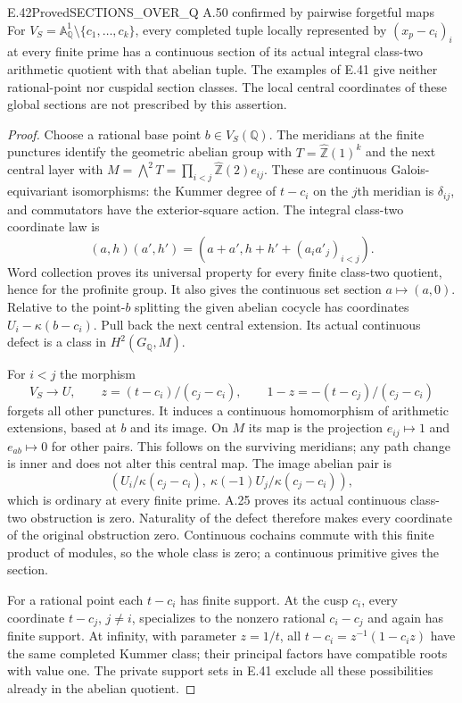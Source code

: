 \begin{result}{E.42}{Proved}{SECTIONS\_OVER\_Q A.50 confirmed by pairwise forgetful maps}
For $V_S=\mathbb A^1_\mathbb Q\setminus\{c_1,\ldots,c_k\}$,
every completed tuple locally represented by $(x_p-c_i)_i$ at every
finite prime has a continuous section of its actual integral
class-two arithmetic quotient with that abelian tuple. The examples
of E.41 give neither rational-point nor cuspidal section classes.
The local central coordinates of these global sections are not
prescribed by this assertion.
\end{result}
\begin{proof}
Choose a rational base point $b\in V_S(\mathbb Q)$. The meridians
at the finite punctures identify the geometric abelian group with
$T=\widehat{\mathbb Z}(1)^k$ and the next central layer with
$M=\bigwedge^2T=\prod_{i<j}\widehat{\mathbb Z}(2)e_{ij}$.
These are continuous Galois-equivariant isomorphisms: the Kummer
degree of $t-c_i$ on the $j$th meridian is $\delta_{ij}$, and
commutators have the exterior-square action. The integral class-two
coordinate law is
\[
 (a,h)(a',h')=(a+a',h+h'+(a_i a'_j)_{i<j}).
\]
Word collection proves its universal property for every finite
class-two quotient, hence for the profinite group. It also gives
the continuous set section $a\mapsto(a,0)$.
Relative to the point-$b$ splitting the given abelian cocycle has
coordinates $U_i-\kappa(b-c_i)$. Pull back the next central
extension. Its actual continuous defect is a class in $H^2(G_\mathbb Q,M)$.

For $i<j$ the morphism
\[
 V_S\longrightarrow U,\qquad
 z=(t-c_i)/(c_j-c_i),\qquad 1-z=-(t-c_j)/(c_j-c_i)
\]
forgets all other punctures. It induces a continuous homomorphism
of arithmetic extensions, based at $b$ and its image. On $M$ its
map is the projection $e_{ij}\mapsto1$ and $e_{ab}\mapsto0$ for
other pairs. This follows on the surviving meridians; any path
change is inner and does not alter this central map.
The image abelian pair is
\[
 (U_i/\kappa(c_j-c_i),\ \kappa(-1)U_j/\kappa(c_j-c_i)),
\]
which is ordinary at every finite prime. A.25 proves its actual
continuous class-two obstruction is zero. Naturality of the defect
therefore makes every coordinate of the original obstruction zero.
Continuous cochains commute with this finite product of modules,
so the whole class is zero; a continuous primitive gives the section.

For a rational point each $t-c_i$ has finite support. At the cusp
$c_i$, every coordinate $t-c_j$, $j\ne i$, specializes to the
nonzero rational $c_i-c_j$ and again has finite support. At infinity,
with parameter $z=1/t$, all $t-c_i=z^{-1}(1-c_i z)$ have the same
completed Kummer class; their principal factors have compatible
roots with value one. The private support sets in E.41 exclude
all these possibilities already in the abelian quotient.
\end{proof}

